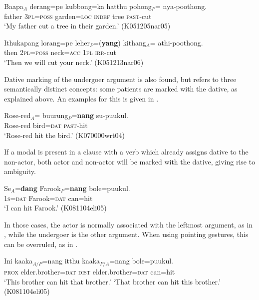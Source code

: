 \documentclass[a4paper,10pt]{article}
\begin{document}
\ea\label{ex:val:2:nomnom}
\gll Baapa$_{A}$   derang=pe     kubbong=ka   hatthu pohong$_{P}$=\zero{} nya-poothong. \\
      father \textsc{3pl}=\textsc{poss} garden=\textsc{loc} \textsc{indef} tree \textsc{past}-cut \\
    `My father cut a tree in their garden.' (K051205nar05)
\z

\ea\label{ex:val:2:nomacc}
\gll  Ithukapang       lorang=pe     leher$_{P}$=(\textbf{yang})  kithang$_{A}$=\zero{} athi-poothong. \\
      then \textsc{2pl}=\textsc{poss} neck=\textsc{acc} \textsc{1pl} \textsc{irr}-cut \\
    `Then we will cut your neck.' (K051213nar06)
\z


Dative marking of the undergoer argument is also found, but refers to three semantically distinct concepts: some patients are marked with the dative, as explained above. An examples for this is given in .

\ea\label{ex:val:2:nomdat:p}
\gll   Rose-red$_{A}$=\zero{} buurung$_{P}$=\textbf{nang}   su-puukul. \\
      Rose-red bird=\textsc{dat} \textsc{past}-hit \\
    `Rose-red hit the bird.' (K070000wrt04)
\z


If a modal is present in a clause with a verb which already assigns dative to the non-actor, both actor and non-actor will be marked with the dative, giving rise to ambiguity.
 
\ea\label{ex:val:2:datdat:mod}
\gll Se$_{A}$=\textbf{dang} Farook$_{P}$=\textbf{nang} bole=puukul. \\
     \textsc{1s=dat} Farook=\textsc{dat} can=hit  \\
    `I can hit Farook.' (K081104eli05)
\z 

In those cases, the actor is normally associated with the leftmost argument, as in , while the undergoer is the other argument. When using pointing gestures, this can be overruled, as in .

\ea\label{ex:val:2:datdat:mod:point}
\gll Ini kaaka$_{A/P}$=nang itthu kaaka$_{P/A}$=nang bole=puukul. \\
     \textsc{prox} elder.brother=\textsc{dat} \textsc{dist} elder.brother=\textsc{dat} can=hit  \\
    `This brother can hit that brother.'
    `That brother can hit this brother.' (K081104eli05)
\z
 
\end{document}

